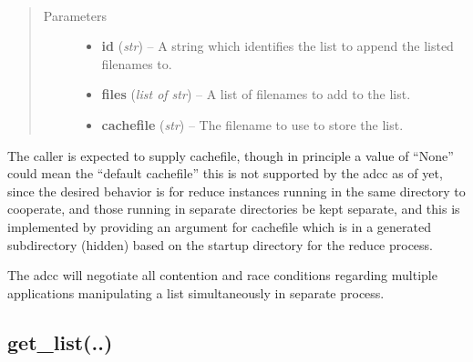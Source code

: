 \documentclass[letterpaper,10pt,english]{sphinxmanual}
\begin{document}
\begin{fulllineitems}
\label{chapter_ReductionContextClass:astrodata.RecipeManager.ReductionContext.list_append}~\begin{quote}\begin{description}
\item[{Parameters}] \leavevmode\begin{itemize}
\item {} 
\textbf{id} (\emph{str}) -- A string which identifies the list to append the listed 
filenames to.

\item {} 
\textbf{files} (\emph{list of str}) -- A list of filenames to add to the list.

\item {} 
\textbf{cachefile} (\emph{str}) -- The filename to use to store the list.

\end{itemize}

\end{description}\end{quote}

The caller is expected to supply cachefile, though in principle
a value of ``None'' could mean the ``default cachefile'' this is not
supported by the adcc as of yet, since the desired behavior is for
reduce instances running in the same directory to cooperate, and those
running in separate directories be kept separate, and this is 
implemented by providing an argument for cachefile which is in a 
generated subdirectory (hidden) based on the startup directory
for the reduce process.

The adcc will negotiate all contention and race conditions regarding
multiple applications manipulating a list simultaneously in separate
process.

\end{fulllineitems}



\subsection{get\_list(..)}
\label{chapter_ReductionContextClass:get-list}
\end{document}

